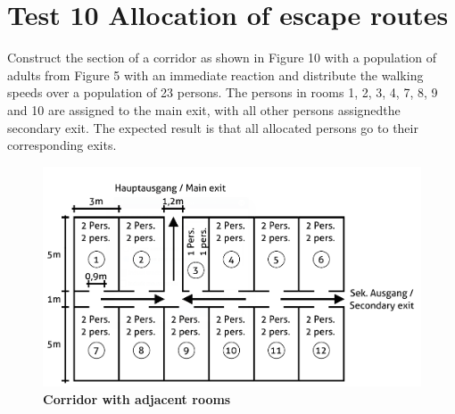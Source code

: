 \section*{Test 10 Allocation of escape routes}

Construct the section of a corridor as shown in Figure 10 with a population of adults from Figure 5 with an immediate reaction and distribute the walking speeds over a population of 23 persons. The persons in rooms 1, 2, 3, 4, 7, 8, 9 and 10 are assigned to the main exit, with all other persons assignedthe secondary exit. The expected result is that all allocated persons go to their corresponding exits.



\begin{figure}[h]
	\centering
	\includegraphics[scale=0.5]{test_description/Corridor_test_10.png}
	\caption{\footnotesize \textbf{Corridor with adjacent rooms}}
\end{figure}

